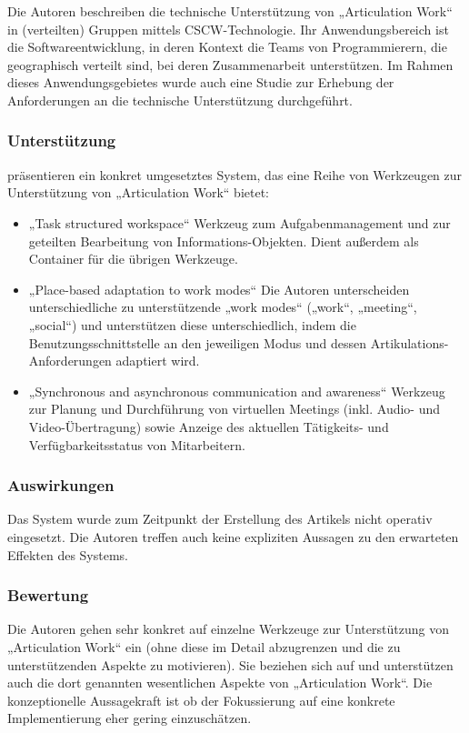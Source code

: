 Die Autoren beschreiben die technische Unterstützung von „Articulation Work“ in (verteilten) Gruppen mittels \gls{CSCW}-Technologie. Ihr Anwendungsbereich ist die Softwareentwicklung, in deren Kontext die Teams von Programmierern, die geographisch verteilt sind, bei deren Zusammenarbeit unterstützen. Im Rahmen dieses Anwendungsgebietes wurde auch eine Studie zur Erhebung der Anforderungen an die technische Unterstützung durchgeführt.

\subsubsection{Unterstützung}

\citep{Fuchs01} präsentieren ein konkret umgesetztes System, das eine Reihe von Werkzeugen zur Unterstützung von „Articulation Work“ bietet:
\begin{itemize}
	\item „Task structured workspace“ Werkzeug zum Aufgabenmanagement und zur geteilten Bearbeitung von Informations-Objekten. Dient außerdem als Container für die übrigen Werkzeuge.
	\item „Place-based adaptation to work modes“ Die Autoren unterscheiden unterschiedliche zu unterstützende „work modes“ („work“, „meeting“, „social“) und unterstützen diese unterschiedlich, indem die Benutzungsschnittstelle an den jeweiligen Modus und dessen Artikulations-Anforderungen adaptiert wird.
	\item „Synchronous and asynchronous communication and awareness“ Werkzeug zur Planung und Durchführung von virtuellen Meetings (inkl. Audio- und Video-Übertragung) sowie Anzeige des aktuellen Tätigkeits- und Verfügbarkeitsstatus von Mitarbeitern.
\end{itemize}

\subsubsection{Auswirkungen}

Das System wurde zum Zeitpunkt der Erstellung des Artikels nicht operativ eingesetzt. Die Autoren treffen auch keine expliziten Aussagen zu den erwarteten Effekten des Systems.

\subsubsection{Bewertung}
Die Autoren gehen sehr konkret auf einzelne Werkzeuge zur Unterstützung von „Articulation Work“ ein (ohne diese im Detail abzugrenzen und die zu unterstützenden Aspekte zu motivieren). Sie beziehen sich auf \citep{Schmidt92} und unterstützen auch die dort genannten wesentlichen Aspekte von „Articulation Work“. Die konzeptionelle Aussagekraft ist ob der Fokussierung auf eine konkrete Implementierung eher gering einzuschätzen.

